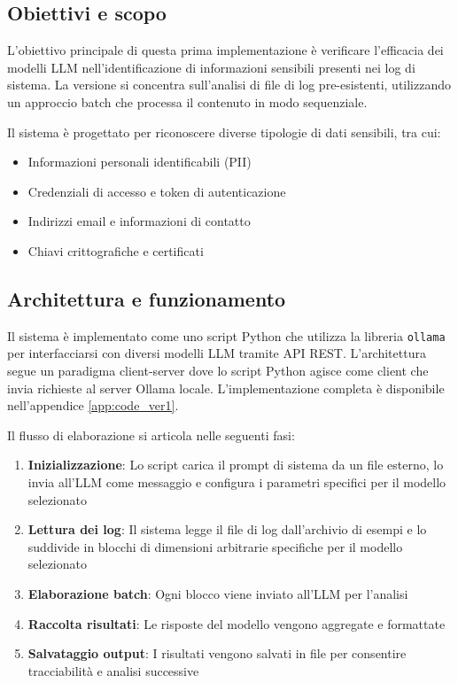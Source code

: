 \documentclass[12pt]{report}
\begin{document}
\subsection{Obiettivi e scopo}
\label{subsec:ver1_obiettivi}

L'obiettivo principale di questa prima implementazione è verificare l'efficacia dei modelli LLM nell'identificazione di informazioni sensibili presenti nei log di sistema. La versione si concentra sull'analisi di file di log pre-esistenti, utilizzando un approccio batch che processa il contenuto in modo sequenziale.

Il sistema è progettato per riconoscere diverse tipologie di dati sensibili, tra cui:
\begin{itemize}
    \item Informazioni personali identificabili (PII)
    \item Credenziali di accesso e token di autenticazione
    \item Indirizzi email e informazioni di contatto
    \item Chiavi crittografiche e certificati
\end{itemize}

\subsection{Architettura e funzionamento}
\label{subsec:ver1_architettura}

Il sistema è implementato come uno script Python che utilizza la libreria \texttt{ollama} per interfacciarsi con diversi modelli LLM tramite API REST. L'architettura segue un paradigma client-server dove lo script Python agisce come client che invia richieste al server Ollama locale. L'implementazione completa è disponibile nell'appendice \ref{app:code_ver1}.

Il flusso di elaborazione si articola nelle seguenti fasi:

\begin{enumerate}
    \item \textbf{Inizializzazione}: Lo script carica il prompt di sistema da un file esterno, lo invia all'LLM come messaggio e configura i parametri specifici per il modello selezionato
    \item \textbf{Lettura dei log}: Il sistema legge il file di log dall'archivio di esempi e lo suddivide in blocchi di dimensioni arbitrarie specifiche per il modello selezionato
    \item \textbf{Elaborazione batch}: Ogni blocco viene inviato all'LLM per l'analisi
    \item \textbf{Raccolta risultati}: Le risposte del modello vengono aggregate e formattate
    \item \textbf{Salvataggio output}: I risultati vengono salvati in file per consentire tracciabilità e analisi successive
\end{enumerate}
\end{document}
